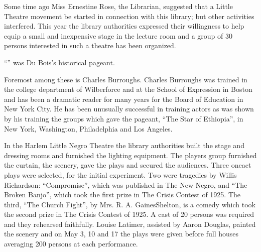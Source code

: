 \documentclass[letterpaper,10pt,english]{jupyterBook}
\begin{document}
\sphinxAtStartPar
Some time ago Miss Ernestine Rose, the Librarian, suggested that a Little Theatre movement be started in connection with this library; but other activities interfered. This year the library authorities expressed their willingness to help equip a small and inexpensive stage in the lecture room and a group of 30 persons interested in such a theatre has been organized.

\begin{sphinxShadowBox}
\sphinxstylesidebartitle{}

\sphinxAtStartPar
“” was Du Bois’s historical pageant.
\end{sphinxShadowBox}

\sphinxAtStartPar
Foremost among these is Charles Burroughs. Charles Burroughs was trained in the college department of Wilberforce and at the School of Expression in Boston and has been a dramatic reader for many years for the Board of Education in New York City. He has been unusually successful in training actors as was shown by his training the groups which gave the pageant, “The Star of Ethiopia”, in New York, Washington, Philadelphia and Los Angeles.

\begin{sphinxShadowBox}
\sphinxstylesidebartitle{}

\sphinxAtStartPar
{}
\end{sphinxShadowBox}

\sphinxAtStartPar
In the Harlem Little Negro Theatre the library authorities built the stage and dressing rooms and furnished the lighting equipment. The players group furnished the curtain, the scenery, gave the plays and secured the audiences. Three one\sphinxhyphen{}act plays were selected, for the initial experiment. Two were tragedies by Willis Richardson: “Compromise”, which was published in The New Negro, and “The Broken Banjo”, which took the first prize in The Crisis Contest of 1925. The third, “The Church Fight”, by Mrs. R. A. Gaines\sphinxhyphen{}Shelton, is a comedy which took the second prize in The Crisis Contest of 1925. A cast of 20 persons was required and they rehearsed faithfully. Louise Latimer, assisted by Aaron Douglas, painted the scenery and on May 3, 10 and 17 the plays were given before full houses averaging 200 persons at each performance.
\end{document}
